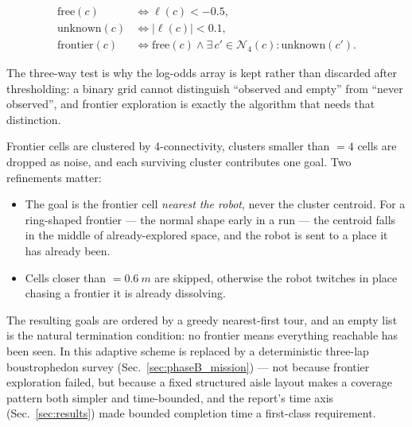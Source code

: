 \begin{align}
\text{free}(c)    &\iff \ell(c) < -0.5, \\
\text{unknown}(c) &\iff |\ell(c)| < 0.1, \\
\text{frontier}(c)&\iff \text{free}(c) \wedge
   \exists\, c' \in \mathcal{N}_4(c) : \text{unknown}(c').
\end{align}

The three-way test is why the log-odds array is kept rather than
discarded after thresholding: a binary grid cannot distinguish
``observed and empty'' from ``never observed'', and frontier exploration
is exactly the algorithm that needs that distinction.

Frontier cells are clustered by 4-connectivity, clusters smaller than
 $= 4$ cells are dropped as noise, and each surviving
cluster contributes one goal. Two refinements matter:

\begin{itemize}[leftmargin=*,itemsep=1pt,topsep=2pt]
  \item The goal is the frontier cell \emph{nearest the robot}, never
        the cluster centroid. For a ring-shaped frontier --- the normal
        shape early in a run --- the centroid falls in the middle of
        already-explored space, and the robot is sent to a place it has
        already been.
  \item Cells closer than  $= \SI{0.6}{m}$ are skipped,
        otherwise the robot twitches in place chasing a frontier it is
        already dissolving.
\end{itemize}

The resulting goals are ordered by a greedy nearest-first tour, and an
empty list is the natural termination condition: no frontier means
everything reachable has been seen. In \phaseB{} this adaptive scheme is
replaced by a deterministic three-lap boustrophedon survey
(Sec.~\ref{sec:phaseB_mission}) --- not because frontier exploration failed,
but because a fixed structured aisle layout makes a coverage pattern
both simpler and time-bounded, and the report's time axis
(Sec.~\ref{sec:results}) made bounded completion time a first-class
requirement.
